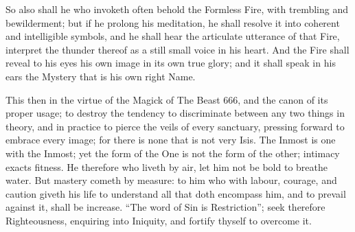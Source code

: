 So also shall he who invoketh often behold the Formless Fire, with trembling and bewilderment; but if he prolong his meditation, he shall resolve it into coherent and intelligible symbols, and he shall hear the articulate utterance of that Fire, interpret the thunder thereof as a still small voice in his heart. And the Fire shall reveal to his eyes his own image in its own true glory; and it shall speak in his ears the Mystery that is his own right Name.

This then in the virtue of the Magick of The Beast 666, and the canon of its proper usage; to destroy the tendency to discriminate between any two things in theory, and in practice to pierce the veils of every sanctuary, pressing forward to embrace every image; for there is none that is not very Isis. The Inmost is one with the Inmost; yet the form of the One is not the form of the other; intimacy exacts fitness. He therefore who liveth by air, let him not be bold to breathe water. But mastery cometh by measure: to him who with labour, courage, and caution giveth his life to understand all that doth encompass him, and to prevail against it, shall be increase. \enquote{The word of Sin is Restriction}; seek therefore Righteousness, enquiring into Iniquity, and fortify thyself to overcome it.
